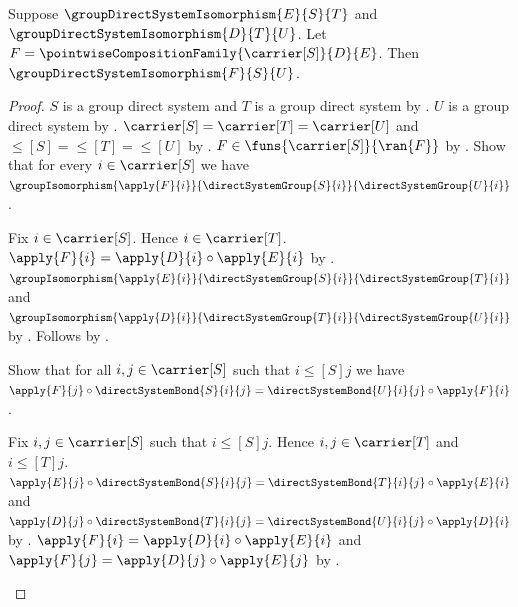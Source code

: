 \begin{theorem}\label{group_direct_system_isomorphism_composition}
    Suppose $\groupDirectSystemIsomorphism{E}{S}{T}$ and
        $\groupDirectSystemIsomorphism{D}{T}{U}$.
    Let $F=\pointwiseCompositionFamily{\carrier[S]}{D}{E}$.
    Then $\groupDirectSystemIsomorphism{F}{S}{U}$.
\end{theorem}
\begin{proof}
    $S$ is a group direct system and $T$ is a group direct system by
        .
    $U$ is a group direct system by
        .
    $\carrier[S]=\carrier[T]=\carrier[U]$ and
        $\leq[S]=\leq[T]=\leq[U]$ by
        .
    $F\in\funs{\carrier[S]}{\ran{F}}$ by
        .
    Show that for every $i\in\carrier[S]$ we have
        $\groupIsomorphism{\apply{F}{i}}
            {\directSystemGroup{S}{i}}{\directSystemGroup{U}{i}}$.
    \begin{subproof}
        Fix $i\in\carrier[S]$.
        Hence $i\in\carrier[T]$.
        $\apply{F}{i}=\apply{D}{i}\circ\apply{E}{i}$ by
            .
        $\groupIsomorphism{\apply{E}{i}}
            {\directSystemGroup{S}{i}}{\directSystemGroup{T}{i}}$ and
            $\groupIsomorphism{\apply{D}{i}}
            {\directSystemGroup{T}{i}}{\directSystemGroup{U}{i}}$ by
            .
        Follows by .
    \end{subproof}
    Show that for all $i,j\in\carrier[S]$ such that
        $i\mathrel{\leq[S]}j$ we have
        $\apply{F}{j}\circ\directSystemBond{S}{i}{j}
            =\directSystemBond{U}{i}{j}\circ\apply{F}{i}$.
    \begin{subproof}
        Fix $i,j\in\carrier[S]$ such that $i\mathrel{\leq[S]}j$.
        Hence $i,j\in\carrier[T]$ and
            $i\mathrel{\leq[T]}j$.
        $\apply{E}{j}\circ\directSystemBond{S}{i}{j}
            =\directSystemBond{T}{i}{j}\circ\apply{E}{i}$ and
            $\apply{D}{j}\circ\directSystemBond{T}{i}{j}
            =\directSystemBond{U}{i}{j}\circ\apply{D}{i}$ by
            .
        $\apply{F}{i}=\apply{D}{i}\circ\apply{E}{i}$ and
            $\apply{F}{j}=\apply{D}{j}\circ\apply{E}{j}$ by
            .

\end{subproof}
\end{proof}
